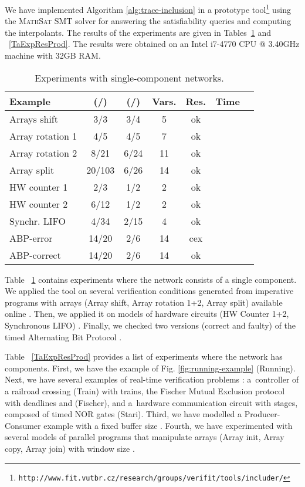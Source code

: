 \documentclass{llncs}
\begin{document}
We have implemented Algorithm \ref{alg:trace-inclusion} in a prototype
tool\footnote{{\tt http://www.fit.vutbr.cz/research/groups/verifit/tools/includer/}}
using the \textsc{MathSat} SMT solver \cite{mathsat} for answering the
satisfiability queries and computing the interpolants. The results of
the experiments are given in Tables~\ref{TaExpRes} and
~\ref{TaExpResProd}. The results were obtained on an Intel i7-4770 CPU
@ 3.40GHz machine with 32GB RAM.

\begin{table}
\begin{center}
{\fontsize{8}{9}\selectfont
  \caption{Experiments with single-component networks.}
  \label{TaExpRes}
\begin{tabular}{||l|c|c|c|c||c|c||}
  \hline
  Example &  (/) &  (/) & Vars. & Res.  & Time \\
  \hline \hline
Arrays shift        & 3/3  & 3/4 & 5 &ok           &   \\
  \hline
Array rotation 1 &  4/5  & 4/5 & 7 &ok    &  \\ 
  \hline
Array rotation 2 &  8/21 & 6/24& 11 &ok    &   \\ 
  \hline
Array split      &  20/103 & 6/26& 14 &ok    &   \\ 
  \hline
HW counter 1      &  2/3 & 1/2 & 2 &ok           &   \\
  \hline
HW counter 2            &  6/12 & 1/2 & 2 &ok           &   \\
  \hline
Synchr. LIFO       &  4/34 & 2/15 & 4 &ok           &   \\
  \hline
ABP-error              & 14/20 & 2/6& 14 &cex  &     \\
  \hline
ABP-correct          &  14/20 & 2/6& 14&ok           &   \\
\hline
\end{tabular}
}
\end{center}
\end{table}

Table ~\ref{TaExpRes} contains experiments where the network
 consists of a single component. We applied the tool on
several verification conditions generated from imperative programs
with arrays \cite{cav09} (Array shift, Array rotation 1+2, Array
split) available online \cite{ntslib}. Then, we applied it on models
of hardware circuits (HW Counter 1+2, Synchronous LIFO)
\cite{smrcka}. Finally, we checked two versions (correct and faulty)
of the timed Alternating Bit Protocol \cite{abp}.

Table ~\ref{TaExpResProd} provides a list of experiments where the
network  has  components. First, we have the example
of Fig. \ref{fig:running-example} (Running). Next, we have several
examples of real-time verification problems \cite{stavros-thesis}:
a~controller of a railroad crossing \cite{henzinger:RealTimeSystems}
(Train) with  trains, the Fischer Mutual Exclusion protocol with
deadlines  and  (Fischer), and a~hardware
communication circuit with  stages, composed of timed NOR gates
(Stari). Third, we have modelled a Producer-Consumer example
\cite{AmitThesis} with a fixed buffer size . Fourth, we have
experimented with several models of parallel programs that manipulate
arrays (Array init, Array copy, Array join) with window size
.
\end{document}
